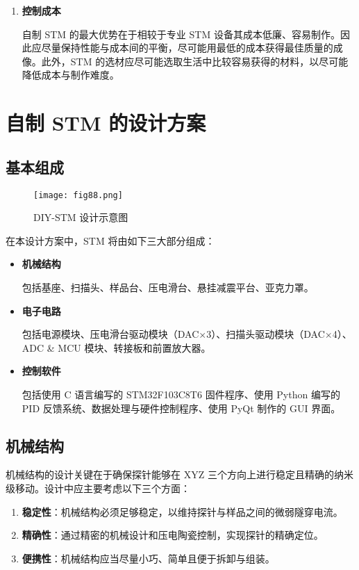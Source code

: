 \documentclass{article}
\begin{document}
\begin{spacing}{1.625}
\begin{enumerate}
		
		\item \textbf{控制成本}\par
		\qquad 自制 STM 的最大优势在于相较于专业 STM 设备其成本低廉、容易制作。因此应尽量保持性能与成本间的平衡，尽可能用最低的成本获得最佳质量的成像。此外，STM 的选材应尽可能选取生活中比较容易获得的材料，以尽可能降低成本与制作难度。
		
	\end{enumerate}
	
	
	
	
	
	
	
	
	
	
	\clearpage
	\section{自制 STM 的设计方案}
	\setParDis %
	\subsection{基本组成}
	\begin{figure}[htbp]
		\centering 
		\texttt{[image: fig88.png]}
		\caption{DIY-STM 设计示意图}
	\end{figure}	
	
	在本设计方案中，STM 将由如下三大部分组成：
	
	\begin{itemize}
		\item \textbf{机械结构}\par
		\qquad 包括基座、扫描头、样品台、压电滑台、悬挂减震平台、亚克力罩。
		
		\item \textbf{电子电路}\par
		\qquad 包括电源模块、压电滑台驱动模块（DAC$\times$3）、扫描头驱动模块（DAC$\times$4）、ADC \& MCU 模块、转接板和前置放大器。
		
		
		\item \textbf{控制软件}\par
		\qquad 包括使用 C 语言编写的 STM32F103C8T6 固件程序、使用 Python 编写的 PID 反馈系统、数据处理与硬件控制程序、使用 PyQt 制作的 GUI 界面。
		
	\end{itemize}
	
	
	
	
	
	
	
	
	\subsection{机械结构}
	机械结构的设计关键在于确保探针能够在 XYZ 三个方向上进行稳定且精确的纳米级移动。设计中应主要考虑以下三个方面：
	\begin{enumerate}
		\item \textbf{稳定性}：机械结构必须足够稳定，以维持探针与样品之间的微弱隧穿电流。
		\item \textbf{精确性}：通过精密的机械设计和压电陶瓷控制，实现探针的精确定位。
		\item \textbf{便携性}：机械结构应当尽量小巧、简单且便于拆卸与组装。
	\end{enumerate}
	

\end{spacing}
\end{document}
